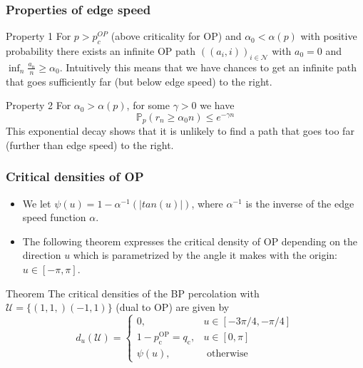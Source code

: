 \begin{frame}
	\frametitle{Properties of edge speed}
	\begin{block}{Property 1}
		For $p > p_{c}^{OP}$ (above criticality for OP) and $\alpha_{0} < \alpha(p)$ with positive probability there exists an infinite OP path $((a_{i}, i))_{i \in \mathcal{N}}$ with $a_{0} = 0$ and $\inf_{n} \frac{a_{n}}{n} \geq \alpha_{0}$. Intuitively this means that we have chances to get an infinite path that goes sufficiently far (but below edge speed) to the right.
	\end{block}

	\begin{block}{Property 2}
		For $\alpha_{0} > \alpha(p)$, for some $\gamma > 0$ we have 
		$$
			\mathbb{P}_{p}(r_{n} \geq \alpha_{0} n) \leq e^{-\gamma n}
		$$
		This exponential decay shows that it is unlikely to find a path that goes too far (further than edge speed) to the right.	
	\end{block}
\end{frame}

\begin{frame}
	\frametitle{Critical densities of OP}
	\begin{itemize}
		\item We let $\psi (u) = 1 - \alpha^{-1}(|tan(u)|)$, where $\alpha^{-1}$ is the inverse of the edge speed function $\alpha$.
		\item The following theorem expresses the critical density of OP depending on the direction $u$ which is parametrized by the angle it makes with the origin: $u \in [- \pi, \pi]$.
	\end{itemize}
	\begin{block}{Theorem}
		The critical densities of the BP percolation with $\mathcal{U} = \{(1, 1,) (-1, 1)\}$ (dual to OP) are given by
		\begin{equation}
			d_{u}(\mathcal{U})= \begin{cases}0, & u \in[-3 \pi / 4,-\pi / 4] \\ 1-p_{\mathrm{c}}^{\mathrm{OP}}=q_{\mathrm{c}}, & u \in[0, \pi] \\ \psi(u), & \text { otherwise }\end{cases}
		\end{equation}
	\end{block}
\end{frame}


